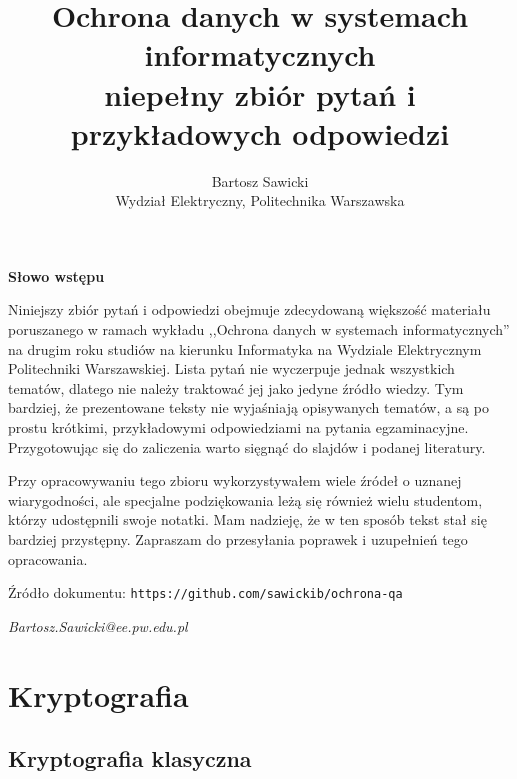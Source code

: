 \documentclass[answers,11pt]{exam}
\title{Ochrona danych w systemach informatycznych \\ \vspace{0.5cm} \large{niepełny zbiór pytań i przykładowych odpowiedzi}}
\author{Bartosz Sawicki \\ \small{Wydział Elektryczny, Politechnika Warszawska}}
\begin{document}
\maketitle

\noindent\textbf{Słowo wstępu}

Niniejszy zbiór pytań i odpowiedzi obejmuje zdecydowaną większość materiału poruszanego w ramach wykładu ,,Ochrona danych w systemach informatycznych'' na drugim roku studiów na kierunku Informatyka na Wydziale Elektrycznym Politechniki Warszawskiej. Lista pytań nie wyczerpuje jednak wszystkich tematów, dlatego nie należy traktować jej jako jedyne źródło wiedzy. Tym bardziej, że prezentowane teksty nie wyjaśniają opisywanych tematów, a są po prostu krótkimi, przykładowymi odpowiedziami na pytania egzaminacyjne. Przygotowując się do zaliczenia warto sięgnąć do slajdów i podanej literatury.

Przy opracowywaniu tego zbioru wykorzystywałem wiele źródeł o uznanej wiarygodności, ale specjalne podziękowania leżą się również wielu studentom, którzy udostępnili swoje notatki. Mam nadzieję, że w ten sposób tekst stał się bardziej przystępny. Zapraszam do przesyłania poprawek i uzupełnień tego opracowania.

Źródło dokumentu: \verb+https://github.com/sawickib/ochrona-qa+

\vspace{0.5cm}\hspace*{10cm}\textit{Bartosz.Sawicki@ee.pw.edu.pl}

\tableofcontents

\section{Kryptografia}

\subsection{Kryptografia klasyczna}
\end{document}
